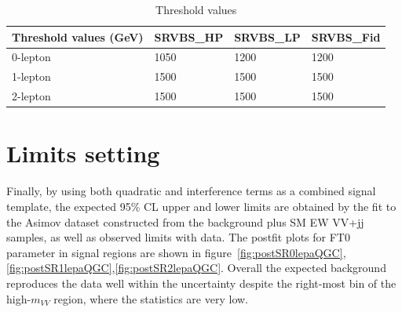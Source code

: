 \begin{table}[ht!]
\small
\begin{center}
\begin{tabular}{ | l || l | l | l |}
\hline
Threshold values (GeV)          & SRVBS\_HP  & SRVBS\_LP & SRVBS\_Fid  \tabularnewline \hline
0-lepton & 1050      & 1200     & 1200       \tabularnewline \hline
1-lepton & 1500      & 1500     & 1500       \tabularnewline \hline
2-lepton & 1500      & 1500     & 1500       \tabularnewline \hline
\end{tabular}
\caption{Threshold values}
\label{tab:2binthreshold}
\end{center}
\end{table}

\section{Limits setting}
Finally, by using both quadratic and interference terms as a combined signal template, the expected 95\% CL upper and lower limits are obtained by the fit to the Asimov dataset constructed from the background plus SM EW VV+jj samples, as well as observed limits with data.
The postfit plots for FT0 parameter in signal regions are shown in figure~\ref{fig:postSR0lepaQGC}, \ref{fig:postSR1lepaQGC},\ref{fig:postSR2lepaQGC}. 
Overall the expected background reproduces the data well within the uncertainty despite the right-most bin of the high-$m_{VV}$ region, where the statistics are very low.
